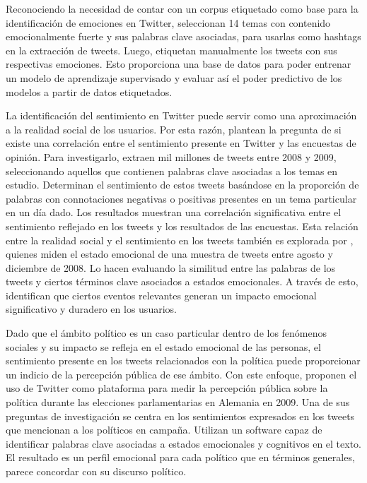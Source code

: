 Reconociendo la necesidad de contar con un corpus etiquetado como base para la identificación de emociones en Twitter, \cite{roberts2012empatweet} seleccionan 14 temas con contenido emocionalmente fuerte y sus palabras clave asociadas, para usarlas como hashtags en la extracción de tweets. Luego, etiquetan manualmente los tweets con sus respectivas emociones. Esto proporciona una base de datos para poder entrenar un modelo de aprendizaje supervisado y evaluar así el poder predictivo de los modelos a partir de datos etiquetados.

La identificación del sentimiento en Twitter puede servir como una aproximación a la realidad social de los usuarios. Por esta razón, \cite{o2010tweets} plantean la pregunta de si existe una correlación entre el sentimiento presente en Twitter y las encuestas de opinión. Para investigarlo, extraen mil millones de tweets entre 2008 y 2009, seleccionando aquellos que contienen palabras clave asociadas a los temas en estudio. Determinan el sentimiento de estos tweets basándose en la proporción de palabras con connotaciones negativas o positivas presentes en un tema particular en un día dado. Los resultados muestran una correlación significativa entre el sentimiento reflejado en los tweets y los resultados de las encuestas. Esta relación entre la realidad social y el sentimiento en los tweets también es explorada por \cite{bollen2011modeling}, quienes miden el estado emocional de una muestra de tweets entre agosto y diciembre de 2008. Lo hacen evaluando la similitud entre las palabras de los tweets y ciertos términos clave asociados a estados emocionales. A través de esto, identifican que ciertos eventos relevantes generan un impacto emocional significativo y duradero en los usuarios.

Dado que el ámbito político es un caso particular dentro de los fenómenos sociales y su impacto se refleja en el estado emocional de las personas, el sentimiento presente en los tweets relacionados con la política puede proporcionar un indicio de la percepción pública de ese ámbito. Con este enfoque, \cite{tumasjan2010predicting} proponen el uso de Twitter como plataforma para medir la percepción pública sobre la política durante las elecciones parlamentarias en Alemania en 2009. Una de sus preguntas de investigación se centra en los sentimientos expresados en los tweets que mencionan a los políticos en campaña. Utilizan un software capaz de identificar palabras clave asociadas a estados emocionales y cognitivos en el texto. El resultado es un perfil emocional para cada político que en términos generales, parece concordar con su discurso político.

